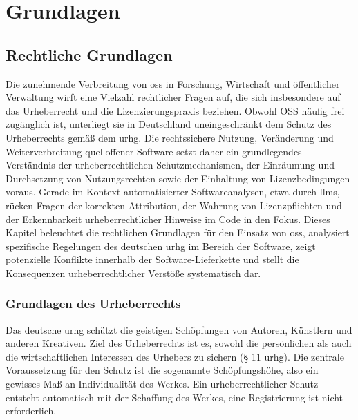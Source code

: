 \chapter{Grundlagen}\label{ch:grundlagen}


\section{Rechtliche Grundlagen}\label{sec:rechtliches}

Die zunehmende Verbreitung von \gls{oss} in Forschung, Wirtschaft und öffentlicher Verwaltung wirft eine Vielzahl rechtlicher Fragen auf, die sich insbesondere auf das Urheberrecht und die Lizenzierungspraxis beziehen.
Obwohl OSS häufig frei zugänglich ist, unterliegt sie in Deutschland uneingeschränkt dem Schutz des Urheberrechts gemäß dem \gls{urhg}\autocite{noauthor_urhg_nodate}.
Die rechtssichere Nutzung, Veränderung und Weiterverbreitung quelloffener Software setzt daher ein grundlegendes Verständnis der urheberrechtlichen Schutzmechanismen, der Einräumung und Durchsetzung von Nutzungsrechten sowie der Einhaltung von Lizenzbedingungen voraus.
Gerade im Kontext automatisierter Softwareanalysen, etwa durch \glspl{llm}, rücken Fragen der korrekten Attribution, der Wahrung von Lizenzpflichten und der Erkennbarkeit urheberrechtlicher Hinweise im Code in den Fokus.
Dieses Kapitel beleuchtet die rechtlichen Grundlagen für den Einsatz von \gls{oss}, analysiert spezifische Regelungen des deutschen \gls{urhg} im Bereich der Software, zeigt potenzielle Konflikte innerhalb der Software-Lieferkette und stellt die Konsequenzen urheberrechtlicher Verstöße systematisch dar.


\subsection{Grundlagen des Urheberrechts}

Das deutsche \acrlong{urhg} schützt die geistigen Schöpfungen von Autoren, Künstlern und anderen Kreativen.
Ziel des Urheberrechts ist es, sowohl die persönlichen als auch die wirtschaftlichen Interessen des Urhebers zu sichern (§ 11 \gls{urhg}).
Die zentrale Voraussetzung für den Schutz ist die sogenannte Schöpfungshöhe, also ein gewisses Maß an Individualität des Werkes.
Ein urheberrechtlicher Schutz entsteht automatisch mit der Schaffung des Werkes, eine Registrierung ist nicht erforderlich.

